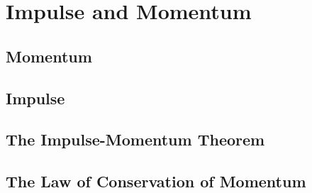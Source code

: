\chapter{Impulse and Momentum}
	\section{Momentum} \label{momentum}  
	\section{Impulse}
	\section{The Impulse-Momentum Theorem}
	\section{The Law of Conservation of Momentum}
	

		


	


